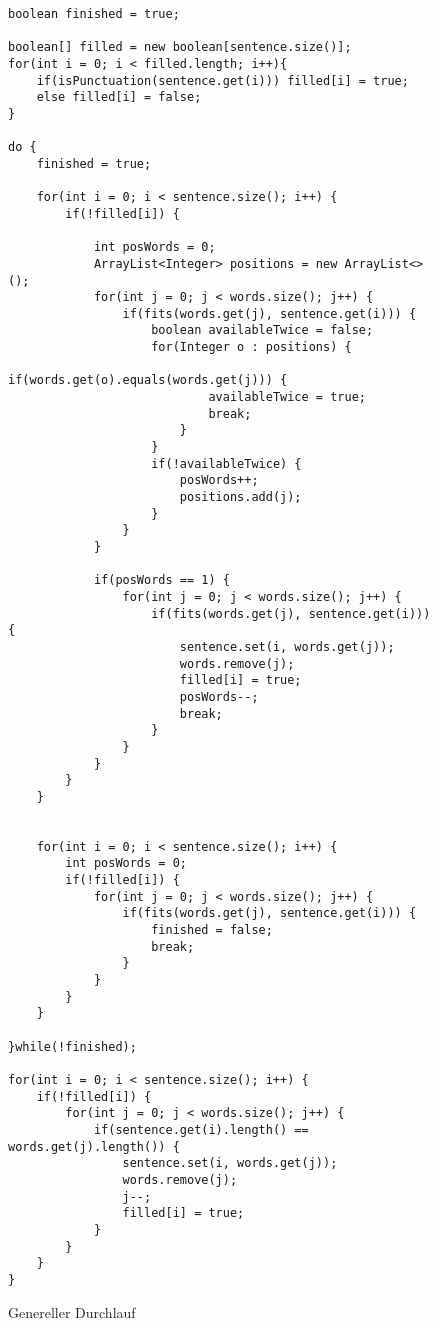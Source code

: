 \documentclass[a4paper, 12pt]{scrartcl}
\begin{document}
\begin{figure}[H]
    \centering
\begin{lstlisting}
boolean finished = true;
        
boolean[] filled = new boolean[sentence.size()];
for(int i = 0; i < filled.length; i++){
    if(isPunctuation(sentence.get(i))) filled[i] = true;
    else filled[i] = false;
}

do {
    finished = true;
    
    for(int i = 0; i < sentence.size(); i++) {
        if(!filled[i]) {
            
            int posWords = 0;
            ArrayList<Integer> positions = new ArrayList<>();
            for(int j = 0; j < words.size(); j++) {
                if(fits(words.get(j), sentence.get(i))) {
                    boolean availableTwice = false;
                    for(Integer o : positions) {
                        if(words.get(o).equals(words.get(j))) {
                            availableTwice = true;
                            break;
                        }
                    }
                    if(!availableTwice) {
                        posWords++;
                        positions.add(j);
                    }
                }
            }
            
            if(posWords == 1) {
                for(int j = 0; j < words.size(); j++) {
                    if(fits(words.get(j), sentence.get(i))) {
                        sentence.set(i, words.get(j));
                        words.remove(j);
                        filled[i] = true;
                        posWords--;
                        break;
                    }
                }
            }
        }
    }
    
    
    for(int i = 0; i < sentence.size(); i++) {
        int posWords = 0;
        if(!filled[i]) {
            for(int j = 0; j < words.size(); j++) {
                if(fits(words.get(j), sentence.get(i))) {
                    finished = false;
                    break;
                }
            }
        }
    }
    
}while(!finished);

for(int i = 0; i < sentence.size(); i++) {
    if(!filled[i]) {
        for(int j = 0; j < words.size(); j++) {
            if(sentence.get(i).length() == words.get(j).length()) {
                sentence.set(i, words.get(j));
                words.remove(j);
                j--;
                filled[i] = true;
            }
        }
    }
}
\end{lstlisting}
\caption{Genereller Durchlauf}
\end{figure}
\end{document}
